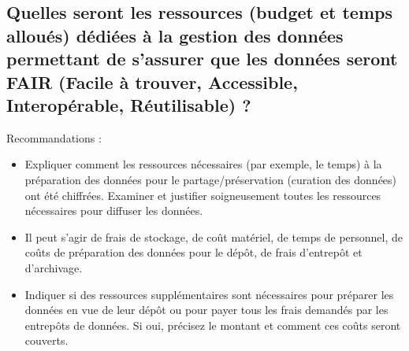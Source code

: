 \documentclass{article}
\begin{document}
\subsection{Quelles seront les ressources (budget et temps alloués) dédiées à la gestion des données permettant de s'assurer que les données seront FAIR (Facile à trouver, Accessible, Interopérable, Réutilisable) ?}
Recommandations :
\begin{itemize}
    \item Expliquer comment les ressources nécessaires (par exemple, le temps) à la préparation des données pour le partage/préservation (curation des données) ont été chiffrées. Examiner et justifier soigneusement toutes les ressources nécessaires pour diffuser les données.
    \item Il peut s'agir de frais de stockage, de coût matériel, de temps de personnel, de coûts de préparation des données pour le dépôt, de frais d’entrepôt et d'archivage.
    \item Indiquer si des ressources supplémentaires sont nécessaires pour préparer les données en vue de leur dépôt ou pour payer tous les frais demandés par les entrepôts de données. Si oui, précisez le montant et comment ces coûts seront couverts.
\end{itemize}
\end{document}
